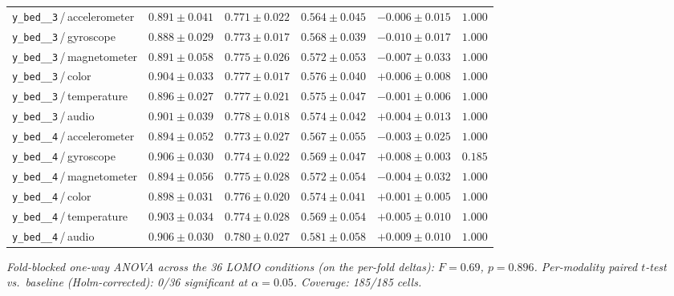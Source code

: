 \begin{table}[!htbp]
\begin{tabular}{l c c c c c}
\texttt{y\_bed\_\_3}\,/\,accelerometer & $0.891 \pm 0.041$ & $0.771 \pm 0.022$ & $0.564 \pm 0.045$ & $-0.006 \pm 0.015$ & $1.000$ \\
\texttt{y\_bed\_\_3}\,/\,gyroscope & $0.888 \pm 0.029$ & $0.773 \pm 0.017$ & $0.568 \pm 0.039$ & $-0.010 \pm 0.017$ & $1.000$ \\
\texttt{y\_bed\_\_3}\,/\,magnetometer & $0.891 \pm 0.058$ & $0.775 \pm 0.026$ & $0.572 \pm 0.053$ & $-0.007 \pm 0.033$ & $1.000$ \\
\texttt{y\_bed\_\_3}\,/\,color & $0.904 \pm 0.033$ & $0.777 \pm 0.017$ & $0.576 \pm 0.040$ & $+0.006 \pm 0.008$ & $1.000$ \\
\texttt{y\_bed\_\_3}\,/\,temperature & $0.896 \pm 0.027$ & $0.777 \pm 0.021$ & $0.575 \pm 0.047$ & $-0.001 \pm 0.006$ & $1.000$ \\
\texttt{y\_bed\_\_3}\,/\,audio & $0.901 \pm 0.039$ & $0.778 \pm 0.018$ & $0.574 \pm 0.042$ & $+0.004 \pm 0.013$ & $1.000$ \\
\texttt{y\_bed\_\_4}\,/\,accelerometer & $0.894 \pm 0.052$ & $0.773 \pm 0.027$ & $0.567 \pm 0.055$ & $-0.003 \pm 0.025$ & $1.000$ \\
\texttt{y\_bed\_\_4}\,/\,gyroscope & $0.906 \pm 0.030$ & $0.774 \pm 0.022$ & $0.569 \pm 0.047$ & $+0.008 \pm 0.003$ & $0.185$ \\
\texttt{y\_bed\_\_4}\,/\,magnetometer & $0.894 \pm 0.056$ & $0.775 \pm 0.028$ & $0.572 \pm 0.054$ & $-0.004 \pm 0.032$ & $1.000$ \\
\texttt{y\_bed\_\_4}\,/\,color & $0.898 \pm 0.031$ & $0.776 \pm 0.020$ & $0.574 \pm 0.041$ & $+0.001 \pm 0.005$ & $1.000$ \\
\texttt{y\_bed\_\_4}\,/\,temperature & $0.903 \pm 0.034$ & $0.774 \pm 0.028$ & $0.569 \pm 0.054$ & $+0.005 \pm 0.010$ & $1.000$ \\
\texttt{y\_bed\_\_4}\,/\,audio & $0.906 \pm 0.030$ & $0.780 \pm 0.027$ & $0.581 \pm 0.058$ & $+0.009 \pm 0.010$ & $1.000$ \\
\bottomrule
\end{tabular}
\par\smallskip
\footnotesize\textit{Fold-blocked one-way ANOVA across the 36 LOMO conditions (on the per-fold deltas): $F=0.69$, $p=0.896$. Per-modality paired $t$-test vs.\ baseline (Holm-corrected): 0/36 significant at $\alpha=0.05$. Coverage: 185/185 cells.}
\end{table}
